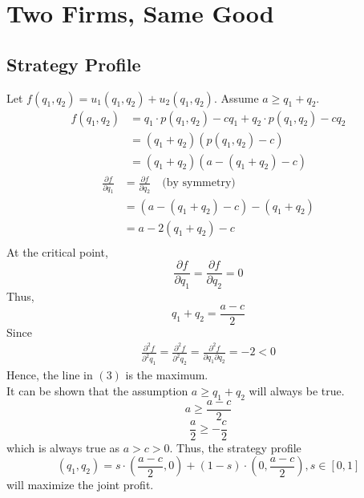 




\section{Two Firms, Same Good}

\subsection{Strategy Profile}
Let $f(q_1,q_2)=u_1(q_1,q_2)+u_2(q_1,q_2)$. Assume $a\geq q_1+q_2$.
\begin{equation}
\begin{aligned}
    f(q_1,q_2)
    &= q_1\cdot p(q_1,q_2) - cq_1 + q_2\cdot p(q_1,q_2) - cq_2\\
    &= (q_1+q_2)(p(q_1,q_2)-c)\\
    &= (q_1+q_2)(a-(q_1+q_2)-c)
\end{aligned}
\end{equation}
\begin{equation}
\begin{aligned}
    \frac{\partial f}{\partial q_1} &= \frac{\partial f}{\partial q_2} 
    \quad\text{(by symmetry)}\\
    &= (a-(q_1+q_2)-c)-(q_1+q_2)\\
    &= a-2(q_1+q_2)-c\\
\end{aligned}
\end{equation}
At the critical point,
\[\frac{\partial f}{\partial q_1}= \frac{\partial f}{\partial q_2} =0\]
Thus,
\begin{equation}
    q_1+q_2=\frac{a-c}{2}
\end{equation}
Since
\begin{equation}
\begin{aligned}
    \frac{\partial^2 f}{\partial^2 q_1} 
    = \frac{\partial^2 f}{\partial^2 q_2} 
    = \frac{\partial^2 f}{\partial q_1\partial q_2} 
    = -2 < 0
\end{aligned}
\end{equation}
Hence, the line in $(3)$ is the maximum.\\
It can be shown that the assumption $a\geq q_1+q_2$ will always be true.
\[a \geq \frac{a-c}{2}\]
\[\frac{a}{2} \geq -\frac{c}{2}\]
which is always true as $a>c>0$.
Thus, the strategy profile
\[(q_1,q_2) 
=s\cdot\left(\frac{a-c}{2},0\right)+(1-s)\cdot\left(0,\frac{a-c}{2}\right),
s\in[0,1]\]
will maximize the joint profit.

